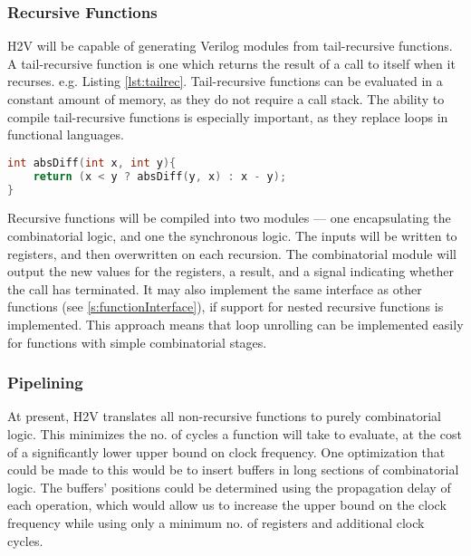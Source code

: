 \documentclass[english,onecolumn]{article}
\begin{document}
\subsubsection{Recursive Functions}
H2V will be capable of generating Verilog modules from tail-recursive functions. A tail-recursive function is one which returns the  result of a call to itself when it recurses. e.g. Listing \ref{lst:tailrec}. Tail-recursive functions can be evaluated in a constant amount of memory, as they do not require a call stack. The ability to compile tail-recursive functions is especially important, as they replace loops in functional languages.

\begin{lstlisting}[language=C, caption={An example of a tail-recursive function in C.}, label={lst:tailrec}]
int absDiff(int x, int y){
    return (x < y ? absDiff(y, x) : x - y);
}
\end{lstlisting}

Recursive functions will be compiled into two modules --- one encapsulating the combinatorial logic, and one the synchronous logic.
The inputs will be written to registers, and then overwritten on each recursion. The combinatorial module will output the new values for the registers, a result, and a signal indicating whether the call has terminated. It may also implement the same interface as other functions (see \ref{s:functionInterface}), if support for nested recursive functions is implemented.
This approach means that loop unrolling can be implemented easily for functions with simple combinatorial stages.

%
% 

\subsubsection{Pipelining}
At present, H2V translates all non-recursive functions to purely combinatorial logic. This minimizes the no. of cycles a function will take to evaluate, at the cost of a significantly lower upper bound on clock frequency. One optimization that could be made to this would be to insert buffers in long sections of combinatorial logic. The buffers' positions could be determined using the propagation delay of each operation, which would allow us to increase the upper bound on the clock frequency while using only a minimum no. of registers and additional clock cycles.
\end{document}
